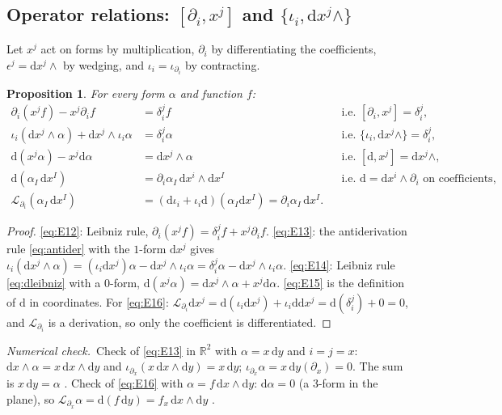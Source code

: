 \documentclass[11pt,a4paper]{article}
\newcounter{thm}[section]
\numberwithin{equation}{section}
\theoremstyle{definition}
\theoremstyle{plain}
\newtheorem{proposition}[thm]{Proposition}
\newcommand{\numcheck}{\textit{Numerical check.}\ }
\newcommand{\R}{\mathbb{R}}
\newcommand{\dd}{\mathrm{d}}
\newcommand{\Lie}{\mathcal{L}}
\begin{document}
\subsection{Operator relations: $[\partial_i,x^j]$ and $\{\iota_i,\dd x^j\wedge\}$}\label{sec:operators}

Let $x^j$ act on forms by multiplication, $\partial_i$ by differentiating the coefficients, $\epsilon^j=\dd x^j\wedge$ by wedging, and $\iota_i=\iota_{\partial_i}$ by contracting.

\begin{proposition}\label{prop:operators}
For every form $\alpha$ and function $f$:
\begin{align}
\partial_i(x^jf)-x^j\partial_if&=\delta^j_if &&\text{i.e. }[\partial_i,x^j]=\delta^j_i,\label{eq:E12}\\
\iota_i(\dd x^j\wedge\alpha)+\dd x^j\wedge\iota_i\alpha&=\delta^j_i\alpha &&\text{i.e. }\{\iota_i,\dd x^j\wedge\}=\delta^j_i,\label{eq:E13}\\
\dd(x^j\alpha)-x^j\dd\alpha&=\dd x^j\wedge\alpha &&\text{i.e. }[\dd,x^j]=\dd x^j\wedge,\label{eq:E14}\\
\dd(\alpha_I\,\dd x^I)&=\partial_i\alpha_I\,\dd x^i\wedge\dd x^I &&\text{i.e. }\dd=\dd x^i\wedge\partial_i\text{ on coefficients,}\label{eq:E15}\\
\Lie_{\partial_i}(\alpha_I\,\dd x^I)&=(\dd\iota_i+\iota_i\dd)(\alpha_I\dd x^I)=\partial_i\alpha_I\,\dd x^I.\label{eq:E16}
\end{align}
\end{proposition}
\begin{proof}
\eqref{eq:E12}: Leibniz rule, $\partial_i(x^jf)=\delta^j_if+x^j\partial_if$. \eqref{eq:E13}: the antiderivation rule \eqref{eq:antider} with the $1$-form $\dd x^j$ gives $\iota_i(\dd x^j\wedge\alpha)=(\iota_i\dd x^j)\alpha-\dd x^j\wedge\iota_i\alpha=\delta^j_i\alpha-\dd x^j\wedge\iota_i\alpha$. \eqref{eq:E14}: Leibniz rule \eqref{eq:dleibniz} with a $0$-form, $\dd(x^j\alpha)=\dd x^j\wedge\alpha+x^j\dd\alpha$. \eqref{eq:E15} is the definition of $\dd$ in coordinates. For \eqref{eq:E16}: $\Lie_{\partial_i}\dd x^j=\dd(\iota_i\dd x^j)+\iota_i\dd\dd x^j=\dd(\delta^j_i)+0=0$, and $\Lie_{\partial_i}$ is a derivation, so only the coefficient is differentiated.
\end{proof}
\numcheck Check of \eqref{eq:E13} in $\R^2$ with $\alpha=x\,\dd y$ and $i=j=x$: $\dd x\wedge\alpha=x\,\dd x\wedge\dd y$ and $\iota_{\partial_x}(x\,\dd x\wedge\dd y)=x\,\dd y$; $\iota_{\partial_x}\alpha=x\,\dd y(\partial_x)=0$. The sum is $x\,\dd y=\alpha$ \checkmark.
Check of \eqref{eq:E16} with $\alpha=f\,\dd x\wedge\dd y$: $\dd\alpha=0$ (a $3$-form in the plane), so $\Lie_{\partial_x}\alpha=\dd(f\,\dd y)=f_x\,\dd x\wedge\dd y$ \checkmark.
\end{document}
